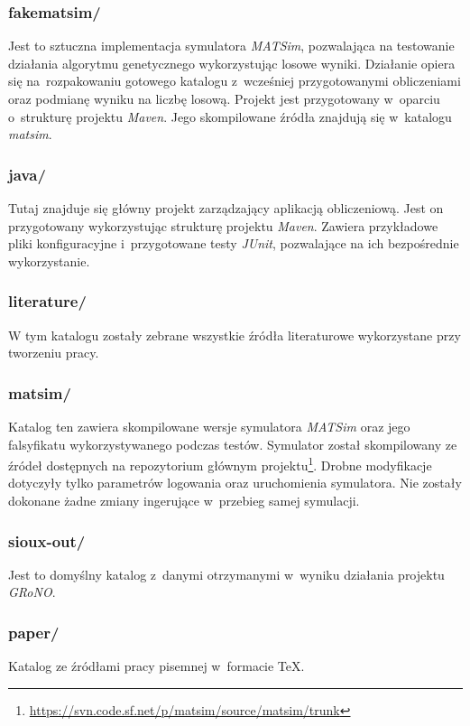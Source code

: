 \documentclass[twoside,12pt]{report}
\begin{document}
\subsubsection{fakematsim/}
Jest to sztuczna implementacja symulatora \textit{MATSim}, pozwalająca na testowanie działania algorytmu genetycznego wykorzystując losowe wyniki. Działanie opiera się na~rozpakowaniu gotowego katalogu z~wcześniej przygotowanymi obliczeniami oraz podmianę wyniku na liczbę losową. Projekt jest przygotowany w~oparciu o~strukturę projektu \textit{Maven}. Jego skompilowane źródła znajdują się  w~katalogu \textit{matsim}.

\subsubsection{java/}
Tutaj znajduje się główny projekt zarządzający aplikacją obliczeniową. Jest on przygotowany wykorzystując strukturę projektu \textit{Maven}. Zawiera przykładowe pliki konfiguracyjne i~przygotowane testy \textit{JUnit}, pozwalające na ich bezpośrednie wykorzystanie.

\subsubsection{literature/}
W tym katalogu zostały zebrane wszystkie źródła literaturowe wykorzystane przy tworzeniu pracy.

\subsubsection{matsim/}
Katalog ten zawiera skompilowane wersje symulatora \textit{MATSim} oraz jego falsyfikatu wykorzystywanego podczas testów. Symulator został skompilowany ze źródeł dostępnych na repozytorium głównym projektu\footnote {\url{https://svn.code.sf.net/p/matsim/source/matsim/trunk}}. Drobne modyfikacje dotyczyły tylko parametrów logowania oraz uruchomienia symulatora. Nie zostały dokonane żadne zmiany ingerujące w~przebieg samej symulacji.

\subsubsection{sioux-out/}
Jest to domyślny katalog z~danymi otrzymanymi w~wyniku działania projektu \textit{GRoNO}.

\subsubsection{paper/}
Katalog ze źródłami pracy pisemnej w~formacie TeX.
\end{document}
